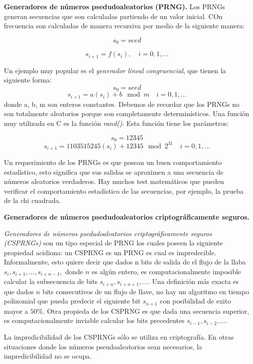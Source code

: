 \documentclass{llncs}
\theoremstyle{plane}
\begin{document}
\textbf{Generadores de números psedudoaleatorios (PRNG).}
Los PRNGs generan secuencias que son calculadas partiendo de un valor inicial. COn frecuencia son calculadas de manera recursiva por medio de la siguiente manera:

\[s_{0}=seed\]

\[s_{i+1}= f(s_{i}), \quad  i =0,1,... \]

Un ejemplo muy popular es el \textit{generador lineal congruencial}, que tienen la siguiente forma:
\[s_{0}=seed\]
\[s_{i+1}= a(s_{i})+b \mod{m}    \quad  i =0,1,... \]
donde a, b, m son enteros constantes. Debemos de recordar que los PRNGs no son totalmente aleatorios porque son completamente determinísticos. Una función muy utilizada en C es la función \textit{rand()}. Esta función tiene los parámetros:

\[s_{0}=12345\]
\[s_{i+1}= 1103515245(s_{i})+ 12345\mod{2^{31}}    \quad  i =0,1,... \]

Un requerimiento de los PRNGs es que posean un buen comportamiento estadístico, esto significa que sus salidas se aproximen a una secuencia de números aleatorios verdaderos. Hay muchos test matemáticos que pueden verificar el comportamiento estadístico de las secuencias, por ejemplo, la prueba de la chi cuadrada.




\textbf{Generadores de números psedudoaleatorios criptográficamente seguros.}

\textit{Generadores de números psedudoaleatorios criptográficamente seguros (CSPRNGs)} son un tipo especial de PRNG los cuales poseen la siguiente propiedad acidiona: un CSPRNG es un PRNG es cual es impredecible. Informalmente, esto quiere decir que dados n bits de salida de el flujo de la llaba $s_{i}, s_{i+1}, ... , s_{i+n-1},$ donde $n$  es algún entero, es computacionalmente imposible calcular la subsecuencia de bits 
$s_{i+n}, s_{i+n+1}, ... $. Una definición más exacta es que dados $n$ bits consecutivos de un flujo de llave, no hay un algoritmo en tiempo polinomial que pueda predecir el siguiente bit $s_{n+1}$ con posibilidad de exito   mayor a $50\%$. Otra propieda de los CSPRNG es que dada una secuencia superior, es computacionalmente inviable calcular los bits precedentes $s_{i-1}, s_{i-2}, ... $.

La impredicibilidad de los CSPRNGs sólo se utiliza en criptografía. En otras situaciones donde los números pseudoaleatorios sean necesarios, la impredicibilidad no se ocupa.
\end{document}
